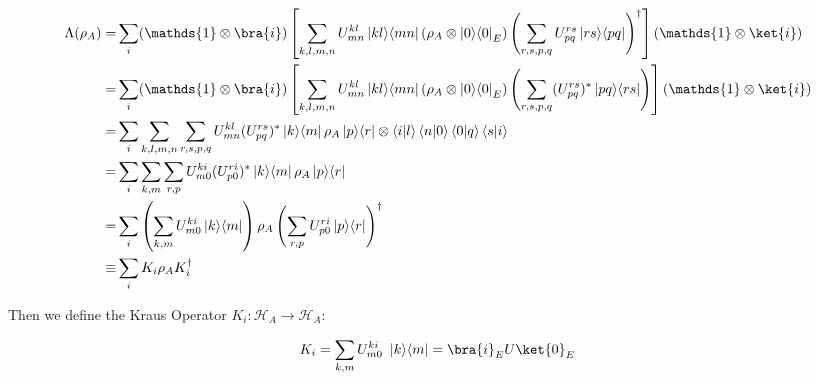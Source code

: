 \begin{equation}
\begin{split}
\Lambda(\rho_A) = &  \sum_i ( \mathds{1} \otimes \bra{i}) \left[ \sum_{k,l,m,n} U^{kl}_{mn} \op{kl}{mn}(\rho_A \otimes \op{0}{0}_E) \left( \sum_{r,s,p,q} U^{rs}_{pq} \op{rs}{pq} \right)^\dagger \right] ( \mathds{1} \otimes \ket{i}) \\
 = & \sum_i ( \mathds{1} \otimes \bra{i}) \left[ \sum_{k,l,m,n} U^{kl}_{mn} \op{kl}{mn}(\rho_A \otimes \op{0}{0}_E) \left( \sum_{r,s,p,q} (U^{rs}_{pq})^{*} \op{pq}{rs} \right) \right] ( \mathds{1} \otimes \ket{i}) \\ 
 = & \sum_i \sum_{k,l,m,n} \sum_{r,s,p,q} U^{kl}_{mn} (U^{rs}_{pq})^{*} \op{k}{m}\rho_A\op{p}{r} \otimes  \ip{i}{l} \ip{n}{0} \ip{0}{q}\ip{s}{i} \\
 = & \sum_i \sum_{k,m} \sum_{r,p} U^{ki}_{m0} (U^{ri}_{p0})^{*} \op{k}{m}\rho_A\op{p}{r} \\
 = & \sum_i \left( \sum_{k,m} U^{ki}_{m0} \op{k}{m} \right) \rho_A \left( \sum_{r,p} U^{ri}_{p0} \op{p}{r} \right)^\dagger \\
 \equiv & \sum_i K_i \rho_A K_i^\dagger
\end{split}
\end{equation}

Then we define the Kraus Operator $K_i : \mathcal{H}_A \rightarrow \mathcal{H}_A$:

\begin{equation}
    \label{Eq: Kraus Operator}
    K_i = \sum_{k,m} U^{ki}_{m0} \ \op{k}{m} = \bra{i}_E U \ket{0}_E
\end{equation}


